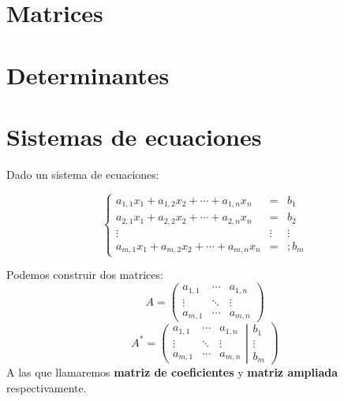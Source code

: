 %
%
%
%
%
%
%
%
%
%
%
%

\section{Matrices}
\section{Determinantes }
\section{Sistemas de ecuaciones}

Dado un sistema de ecuaciones: 

$${\displaystyle \left\{{\begin{matrix}a_{1,1}x_{1}+a_{1,2}x_{2}+\cdots +a_{1,n}x_{n}&=&b_{1}\\a_{2,1}x_{1}+a_{2,2}x_{2}+\cdots +a_{2,n}x_{n}&=&b_{2}\\\vdots & \vdots & \vdots \\a_{m,1}x_{1}+a_{m,2}x_{2}+\cdots +a_{m,n}x_{n}&=&;b_{m}\end{matrix}}\right.}$$

Podemos construir dos matrices:
$${\displaystyle A={\begin{pmatrix}a_{1,1}&\cdots &a_{1,n}\\\vdots &\ddots &\vdots \\a_{m,1}&\cdots &a_{m,n}\end{pmatrix}}}$$
$${\displaystyle A^{*}=\left({\begin{matrix}a_{1,1}&\cdots &a_{1,n}\\\vdots &\ddots &\vdots \\a_{m,1}&\cdots &a_{m,n}\end{matrix}}\right|\left.{\begin{matrix}b_{1}\\\vdots \\b_{m}\end{matrix}}\right)}$$
A las que llamaremos \textbf{matriz de coeficientes} y \textbf{matriz ampliada} respectivamente.

